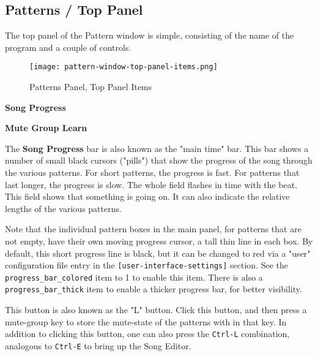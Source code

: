 \subsection{Patterns / Top Panel}
\label{subsec:seq64_patterns_panel_top}

   The top panel of the Pattern window is simple, consisting of the name of
   the program and a couple of controls.

\begin{figure}[H]
   \centering 
   \texttt{[image: pattern-window-top-panel-items.png]}
   \caption{Patterns Panel, Top Panel Items}
   \label{fig:pattern_window_top_panel_items}
\end{figure}

   \begin{enumber}
      \item \textbf{Song Progress}
      \item \textbf{Mute Group Learn}
   \end{enumber}

   \setcounter{ItemCounter}{0}      %

   The \textbf{Song Progress} bar is also known as the "main time" bar.
   This bar shows a number of small black cursors ("pills") that show the
   progress of the song through the various patterns.  For short patterns,
   the progress is fast.  For patterns that last longer, the progress is
   slow.  The whole field flashes in time with the beat.
   This field shows that something is going on.  It can also indicate
   the relative lengths of the various patterns.
 
   Note that the individual pattern boxes in the main panel, for
   patterns that are not empty, have their own
   moving progress cursor, a tall thin line in each box.
   By default, this short progress line is black, but it can be changed to
   red via a "user" configuration file entry in the 
   \texttt{[user-interface-settings]} section.
   See the \texttt{progress\_bar\_colored} item to 1 to enable this item.
   There is also a \texttt{progress\_bar\_thick} item to enable a thicker
   progress bar, for better visibility.


   This button is also known as the "L" button.
   Click this button, and then press a mute-group key
   to store the mute-state of the patterns with in that key.
   In addition to clicking this button, one can also press
   the \texttt{Ctrl-L} combination, analogous to \texttt{Ctrl-E}
   to bring up the Song Editor.

